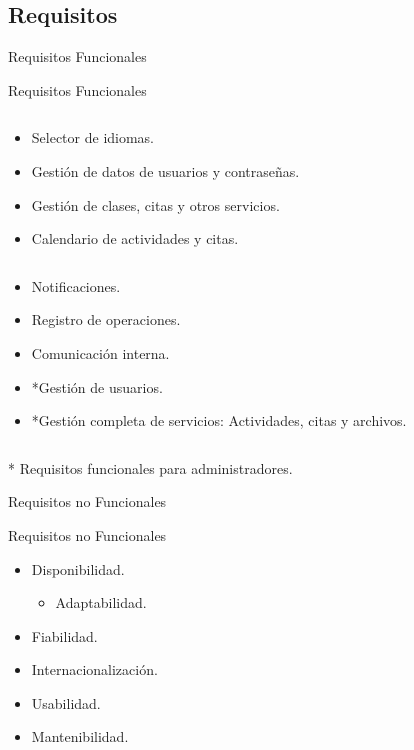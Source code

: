 \documentclass[spanish,xcolor=table,svgnames]{beamer}
\begin{document}
\subsection*{Requisitos}
\begin{frame}{Requisitos Funcionales}
  \begin{block}{Requisitos Funcionales}
    \begin{column}{0.5\textwidth}
  \begin{itemize}
    \item Selector de idiomas.
    \item Gestión de datos de usuarios y contraseñas.
    \item Gestión de clases, citas y otros servicios.
    \item Calendario de actividades y citas.
  \end{itemize}
    \end{column}
    \begin{column}{0.5\textwidth}
  \begin{itemize}
    \item Notificaciones.
    \item Registro de operaciones.
    \item Comunicación interna.
    \item *Gestión de usuarios.
    \item *Gestión completa de servicios: Actividades, citas y archivos.
  \end{itemize}
    \end{column}
  \end{block}
  * Requisitos funcionales para administradores.
\end{frame}

\begin{frame}{Requisitos no Funcionales}
  \begin{block}{Requisitos no Funcionales}
  \begin{itemize}
    \item Disponibilidad.
  \begin{itemize}
    \item Adaptabilidad.
  \end{itemize}
    \item Fiabilidad.
    \item Internacionalización.
    \item Usabilidad.
    \item Mantenibilidad.
  \end{itemize}
  \end{block}
\end{frame}
\end{document}

